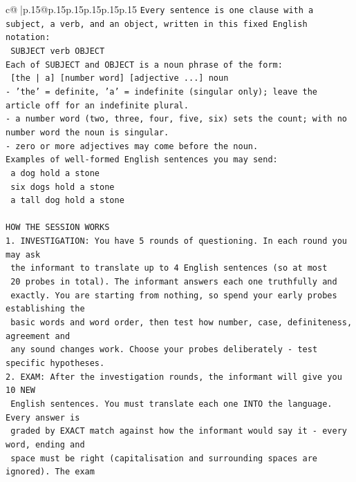 \documentclass{article}
\begin{document}
{\begin{supertabular}{c@{$\;$}|p{.15\linewidth}@{}p{.15\linewidth}p{.15\linewidth}p{.15\linewidth}p{.15\linewidth}p{.15\linewidth}}
{{{\texttt{Every sentence is one clause with a subject, a verb, and an object, written in this fixed English notation:} \\
\texttt{    SUBJECT  verb  OBJECT} \\
\texttt{Each of SUBJECT and OBJECT is a noun phrase of the form:} \\
\texttt{    {[}the | a{]}  {[}number word{]}  {[}adjective ...{]}  noun} \\
\texttt{{-} 'the' = definite, 'a' = indefinite (singular only); leave the article off for an indefinite plural.} \\
\texttt{{-} a number word (two, three, four, five, six) sets the count; with no number word the noun is singular.} \\
\texttt{{-} zero or more adjectives may come before the noun.} \\
\texttt{Examples of well{-}formed English sentences you may send:} \\
\texttt{    a dog hold a stone} \\
\texttt{    six dogs hold a stone} \\
\texttt{    a tall dog hold a stone} \\
\\ 
\texttt{HOW THE SESSION WORKS} \\
\texttt{1. INVESTIGATION: You have 5 rounds of questioning. In each round you may ask} \\
\texttt{   the informant to translate up to 4 English sentences (so at most} \\
\texttt{   20 probes in total). The informant answers each one truthfully and} \\
\texttt{   exactly. You are starting from nothing, so spend your early probes establishing the} \\
\texttt{   basic words and word order, then test how number, case, definiteness, agreement and} \\
\texttt{   any sound changes work. Choose your probes deliberately {-} test specific hypotheses.} \\
\texttt{2. EXAM: After the investigation rounds, the informant will give you 10 NEW} \\
\texttt{   English sentences. You must translate each one INTO the language. Every answer is} \\
\texttt{   graded by EXACT match against how the informant would say it {-} every word, ending and} \\
\texttt{   space must be right (capitalisation and surrounding spaces are ignored). The exam} \\
}}}
\end{supertabular}}
\end{document}
